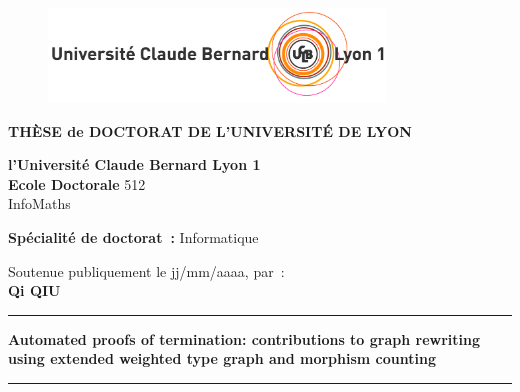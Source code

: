 
\begin{titlepage}

    \unitlength 1cm
    \begin{center}
    
    \vspace*{-2.5cm}
    \begin{figure}[h]
        \centering
        \includegraphics[width=0.8\textwidth]{LogoLyon1Off_CoulCmjn300dpi.jpg}
    \end{figure}
    
               {\large\bf THÈSE de DOCTORAT DE L'UNIVERSITÉ DE LYON\\}
   
               {\large \bf l'Université Claude Bernard Lyon 1\\}
    \vspace{12pt}
               {\large \textbf{Ecole Doctorale} 512 \\InfoMaths}

    \vspace{12pt}
    
               {\large \textbf{Spécialité de doctorat~:} Informatique \\}
    
    \vspace{0.8cm}
    
               {Soutenue publiquement le jj/mm/aaaa, par~:\\}
               {\Large\bf {Qi QIU}}
    \vspace{0.5cm}           
    
    
    \rule{5cm}{1pt}
    
    \vspace{12pt}
               
               {\LARGE \bf Automated proofs of termination: contributions to graph rewriting using extended weighted type graph and morphism counting}\\
               \vspace{0.3cm}
               {\Large \bf }
               
    \vspace{12pt}
    \rule{5cm}{1pt}
    

\end{center}
\end{titlepage}
